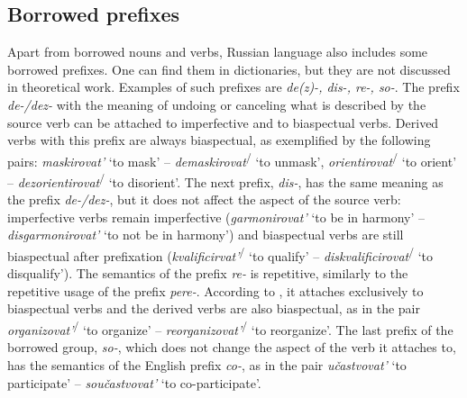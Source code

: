 \subsection{Borrowed prefixes}\label{subsection:perf:prefixes}
%
%
%
Apart from borrowed nouns and verbs, Russian language also includes some borrowed prefixes.  One can find them in dictionaries, but they are not discussed in theoretical work. Examples of such prefixes are \textit{de(z)-, dis-, re-, so-}. The prefix \textit{de-/dez-} with the meaning of undoing or canceling what is described by the source verb can be attached to imperfective and to biaspectual verbs. Derived verbs with this prefix are always biaspectual, as exemplified by the following pairs: \textit{maskirovat'}\textsuperscript{\IPF} `to mask' -- \textit{demaskirovat}\textsuperscript{\IPF\slash\PF} `to unmask', \textit{orientirovat}\textsuperscript{\IPF\slash\PF} `to orient' -- \textit{dezorientirovat}\textsuperscript{\IPF\slash\PF} `to disorient'. The next prefix, \textit{dis-}, has the same meaning as the prefix \textit{de-/dez-}, but it does not affect the aspect of the source verb: imperfective verbs remain imperfective (\textit{garmonirovat'}\textsuperscript{\IPF} `to be in harmony' -- \textit{disgarmonirovat'}\textsuperscript{\IPF} `to not be in harmony') and biaspectual verbs are still biaspectual after prefixation (\textit{kvalificirvat'}\textsuperscript{\IPF\slash\PF} `to qualify' -- \textit{diskvalificirovat}\textsuperscript{\IPF\slash\PF} `to disqualify'). The semantics of the prefix \textit{re-} is repetitive, similarly to the repetitive usage of the prefix \textit{pere-}. According to \citet[369]{Shvedova:82}, it attaches exclusively to biaspectual verbs and the derived verbs are also biaspectual, as in the pair \textit{organizovat'}\textsuperscript{\IPF\slash\PF}  `to organize' -- \textit{reorganizovat'}\textsuperscript{\IPF\slash\PF}  `to reorganize'. The last prefix of the borrowed group, \textit{so-}, which does not change the aspect of the verb it attaches to, has the semantics of the English prefix \textit{co-}, as in the pair  \textit{u\v{c}astvovat'}\textsuperscript{\IPF}  `to participate' -- \textit{sou\v{c}astvovat'}\textsuperscript{\IPF}  `to co-participate'.


